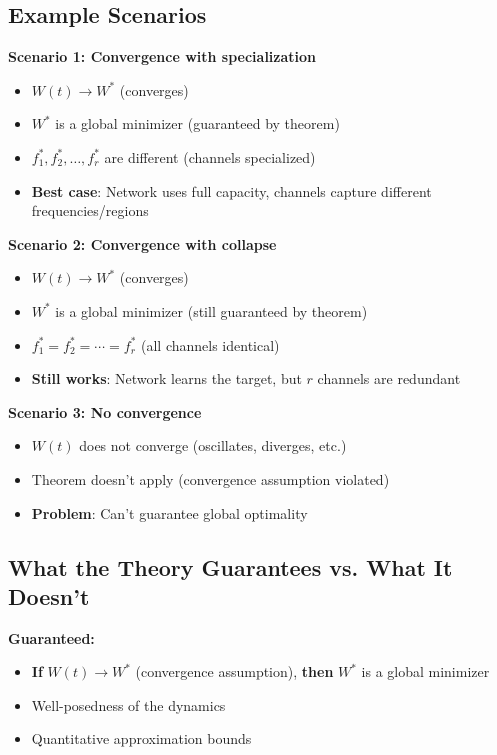 \subsection{Example Scenarios}

\textbf{Scenario 1: Convergence with specialization}
\begin{itemize}
\item $W(t) \to W^*$ (converges)
\item $W^*$ is a global minimizer (guaranteed by theorem)
\item $f_1^*, f_2^*, \ldots, f_r^*$ are different (channels specialized)
\item \textbf{Best case}: Network uses full capacity, channels capture different frequencies/regions
\end{itemize}

\textbf{Scenario 2: Convergence with collapse}
\begin{itemize}
\item $W(t) \to W^*$ (converges)
\item $W^*$ is a global minimizer (still guaranteed by theorem)
\item $f_1^* = f_2^* = \cdots = f_r^*$ (all channels identical)
\item \textbf{Still works}: Network learns the target, but $r$ channels are redundant
\end{itemize}

\textbf{Scenario 3: No convergence}
\begin{itemize}
\item $W(t)$ does not converge (oscillates, diverges, etc.)
\item Theorem doesn't apply (convergence assumption violated)
\item \textbf{Problem}: Can't guarantee global optimality
\end{itemize}

\subsection{What the Theory Guarantees vs. What It Doesn't}

\textbf{Guaranteed:}
\begin{itemize}
\item \textbf{If} $W(t) \to W^*$ (convergence assumption), \textbf{then} $W^*$ is a global minimizer
\item Well-posedness of the dynamics
\item Quantitative approximation bounds
\end{itemize}

